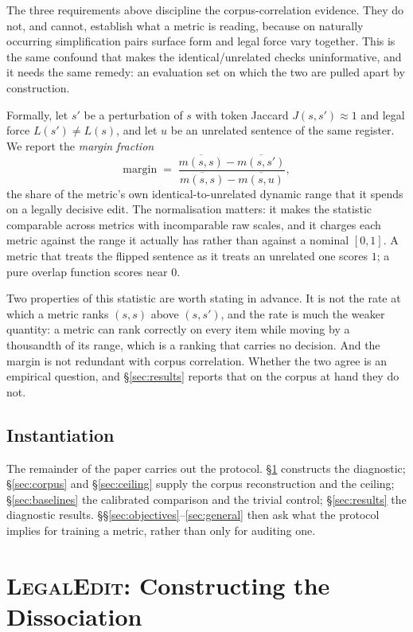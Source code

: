 \documentclass[11pt]{article}
\begin{document}
The three requirements above discipline the corpus-correlation evidence. They do
not, and cannot, establish what a metric is reading, because on naturally
occurring simplification pairs surface form and legal force vary together. This
is the same confound that makes the identical/unrelated checks uninformative,
and it needs the same remedy: an evaluation set on which the two are pulled
apart by construction.

Formally, let $s'$ be a perturbation of $s$ with token Jaccard
$J(s,s') \approx 1$ and legal force $L(s') \neq L(s)$, and let $u$ be an
unrelated sentence of the same register. We report the \emph{margin fraction}
\[
\text{margin} \;=\; \frac{\overline{m(s,s)} - \overline{m(s,s')}}
                          {\overline{m(s,s)} - \overline{m(s,u)}},
\]
the share of the metric's own identical-to-unrelated dynamic range that it
spends on a legally decisive edit. The normalisation matters: it makes the
statistic comparable across metrics with incomparable raw scales, and it charges
each metric against the range it actually has rather than against a nominal
$[0,1]$. A metric that treats the flipped sentence as it treats an unrelated one
scores $1$; a pure overlap function scores near $0$.

Two properties of this statistic are worth stating in advance. It is not the
rate at which a metric ranks $(s,s)$ above $(s,s')$, and the rate is much the
weaker quantity: a metric can rank correctly on every item while moving by a
thousandth of its range, which is a ranking that carries no decision. And the
margin is not redundant with corpus correlation. Whether the two agree is an
empirical question, and \S\ref{sec:results} reports that on the corpus at hand
they do not.

\subsection{Instantiation}

The remainder of the paper carries out the protocol. \S\ref{sec:legaledit}
constructs the diagnostic; \S\ref{sec:corpus} and \S\ref{sec:ceiling} supply the
corpus reconstruction and the ceiling; \S\ref{sec:baselines} the calibrated
comparison and the trivial control; \S\ref{sec:results} the diagnostic results.
\S\S\ref{sec:objectives}--\ref{sec:general} then ask what the protocol implies
for training a metric, rather than only for auditing one.

\section{\textsc{LegalEdit}: Constructing the Dissociation}
\label{sec:legaledit}
\end{document}
